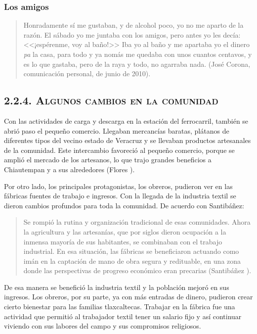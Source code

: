 \documentclass[14pt,letterpaper,twoside]{extbook} %
\begin{document}
\subsubsection{\mdseries Los amigos}

\begin{quotation}
\noindent Honradamente sí me gustaban, y de alcohol poco, yo no me aparto de la razón. El sábado yo me juntaba con los amigos, pero antes yo les decía: <<¡espérenme, voy al baño!>> Iba yo al baño y me apartaba yo el dinero \textit{pa} la casa, para todo y ya nomás me quedaba con unos cuantos centavos, y es lo que gastaba, pero de la raya y todo, no agarraba nada. (José Corona, comunicación personal,  de junio de 2010).
\end{quotation}

\subsection*{\mdseries\large\textsc{2.2.4. Algunos cambios en la comunidad}}

\noindent Con las actividades de carga y descarga en la estación del ferrocarril, también se abrió paso el pequeño comercio. Llegaban mercancías baratas, plátanos de diferentes tipos del vecino estado de Veracruz y se llevaban productos artesanales de la comunidad. Este intercambio favoreció al pequeño comercio, porque se amplió el mercado de los artesanos, lo que trajo grandes beneficios a Chiautempan y a sus alrededores (Flores ).

Por otro lado, los principales protagonistas, los obreros, pudieron ver en las fábricas fuentes de trabajo e ingresos. Con la llegada de la industria textil se dieron cambios profundos para toda la comunidad. De acuerdo con Santibáñez:

\begin{quotation}
\noindent Se rompió la rutina y organización tradicional de esas comunidades. Ahora la agricultura y las artesanías, que por siglos dieron ocupación a la inmensa mayoría de sus habitantes, se combinaban con el trabajo industrial. En esa situación, las fábricas se beneficiaron actuando como imán en la captación de mano de obra segura y redituable, en una zona donde las perspectivas de progreso económico eran precarias (Santibáñez ).
\end{quotation}

\noindent De esa manera se benefició la industria textil y la población mejoró en sus ingresos. Los obreros, por su parte, ya con más entradas de dinero, pudieron crear cierto bienestar para las familias tlaxcaltecas. Trabajar en la fábrica fue una actividad que permitió al trabajador textil tener un salario fijo y así continuar viviendo con sus labores del campo y sus compromisos religiosos.
\end{document}
